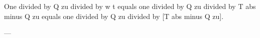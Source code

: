 One divided by Q zu divided by w t equals one divided by Q zu divided by T abs minus Q zu equals one divided by Q zu divided by [T abs minus Q zu].  

---